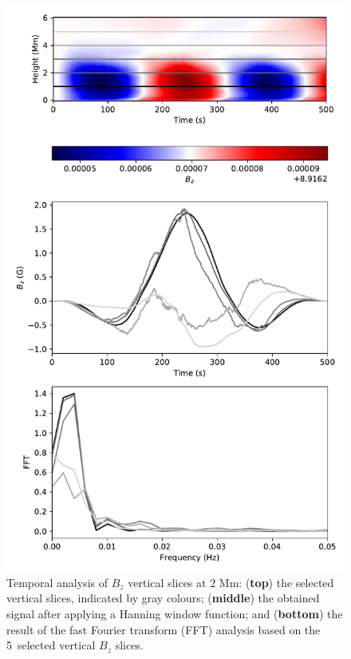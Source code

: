 \documentclass[physics,article,accept,pdftex,moreauthors]{Definitions/mdpi}
\begin{document}
 \begin{figure}[H]
    \includegraphics[width=9%
.5cm]{fft_sim.pdf}
    \caption{{Temporal} %
analysis of $B_{z}$ vertical slices at $2$ {Mm:} {({\bf top})} %
the selected vertical slices, indicated by gray 
 {colours;  ({\bf middle})} %
the obtained signal after applying a Hanning window {function; and ({\bf bottom})} %
the result of the {fast Fourier transform  
(FFT)} analysis based on the 5~selected vertical $B_{z}$ slices.\label{fig10}}
\end{figure}
\end{document}
